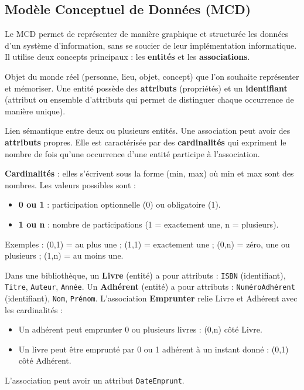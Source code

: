 \subsection*{Modèle Conceptuel de Données (MCD)}
Le MCD permet de représenter de manière graphique et structurée les données d'un système d'information, sans se soucier de leur implémentation informatique. Il utilise deux concepts principaux : les \textbf{entités} et les \textbf{associations}.

\begin{definition}[Entité]
Objet du monde réel (personne, lieu, objet, concept) que l'on souhaite représenter et mémoriser. Une entité possède des \textbf{attributs} (propriétés) et un \textbf{identifiant} (attribut ou ensemble d'attributs qui permet de distinguer chaque occurrence de manière unique).
\end{definition}

\begin{definition}[Association]
Lien sémantique entre deux ou plusieurs entités. Une association peut avoir des \textbf{attributs} propres. Elle est caractérisée par des \textbf{cardinalités} qui expriment le nombre de fois qu'une occurrence d'une entité participe à l'association.
\end{definition}

\begin{aretenir}
\textbf{Cardinalités} : elles s'écrivent sous la forme (min, max) où min et max sont des nombres. Les valeurs possibles sont :
\begin{itemize}
    \item \textbf{0 ou 1} : participation optionnelle (0) ou obligatoire (1).
    \item \textbf{1 ou n} : nombre de participations (1 = exactement une, n = plusieurs).
\end{itemize}
Exemples : (0,1) = au plus une ; (1,1) = exactement une ; (0,n) = zéro, une ou plusieurs ; (1,n) = au moins une.
\end{aretenir}

\begin{exemple}
Dans une bibliothèque, un \textbf{Livre} (entité) a pour attributs : \texttt{ISBN} (identifiant), \texttt{Titre}, \texttt{Auteur}, \texttt{Année}. Un \textbf{Adhérent} (entité) a pour attributs : \texttt{NuméroAdhérent} (identifiant), \texttt{Nom}, \texttt{Prénom}. L'association \textbf{Emprunter} relie Livre et Adhérent avec les cardinalités :
\begin{itemize}
    \item Un adhérent peut emprunter 0 ou plusieurs livres : (0,n) côté Livre.
    \item Un livre peut être emprunté par 0 ou 1 adhérent à un instant donné : (0,1) côté Adhérent.
\end{itemize}
L'association peut avoir un attribut \texttt{DateEmprunt}.
\end{exemple}

